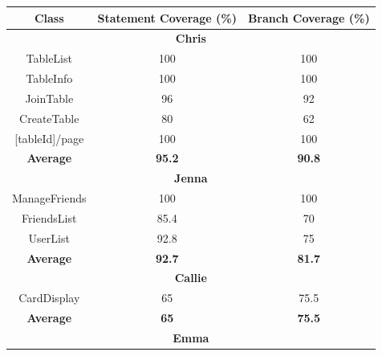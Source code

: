 \begin{table}[!hbt]
\begin{tabular}{|ccc|}
\hline
\multicolumn{1}{|c|}{\textbf{Class}} & \multicolumn{1}{c|}{\textbf{Statement Coverage (\%)}} & \textbf{Branch Coverage (\%)} \\ \hline
\multicolumn{3}{|c|}{\textbf{Chris}}                                                          \\ \hline
\multicolumn{1}{|c|}{TableList}          & \multicolumn{1}{c|}{100}           & 100           \\ \hline
\multicolumn{1}{|c|}{TableInfo}          & \multicolumn{1}{c|}{100}           & 100           \\ \hline
\multicolumn{1}{|c|}{JoinTable}          & \multicolumn{1}{c|}{96}            & 92            \\ \hline
\multicolumn{1}{|c|}{CreateTable}        & \multicolumn{1}{c|}{80}            & 62            \\ \hline
\multicolumn{1}{|c|}{{[}tableId{]}/page} & \multicolumn{1}{c|}{100}           & 100           \\ \hline
\multicolumn{1}{|c|}{\textbf{Average}}   & \multicolumn{1}{c|}{\textbf{95.2}} & \textbf{90.8} \\ \hline
\multicolumn{3}{|c|}{\textbf{Jenna}}                                                          \\ \hline
\multicolumn{1}{|c|}{ManageFriends}      & \multicolumn{1}{c|}{100}           & 100           \\ \hline
\multicolumn{1}{|c|}{FriendsList}        & \multicolumn{1}{c|}{85.4}          & 70            \\ \hline
\multicolumn{1}{|c|}{UserList}           & \multicolumn{1}{c|}{92.8}          & 75            \\ \hline
\multicolumn{1}{|c|}{\textbf{Average}}   & \multicolumn{1}{c|}{\textbf{92.7}} & \textbf{81.7} \\ \hline
\multicolumn{3}{|c|}{\textbf{Callie}}                                                         \\ \hline
\multicolumn{1}{|c|}{CardDisplay}        & \multicolumn{1}{c|}{65}            & 75.5          \\ \hline
\multicolumn{1}{|c|}{\textbf{Average}}   & \multicolumn{1}{c|}{\textbf{65}}   & \textbf{75.5} \\ \hline
\multicolumn{3}{|c|}{\textbf{Emma}}                                                           \\ \hline

\end{tabular}
\end{table}
